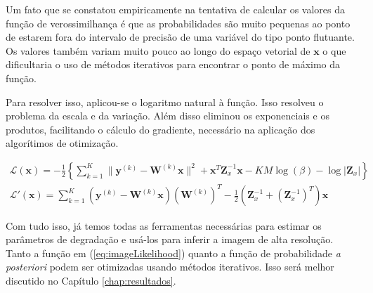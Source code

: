 Um fato que se constatou empiricamente na tentativa de calcular os valores da função de verossimilhança é que as probabilidades são muito pequenas ao ponto de estarem fora do intervalo de precisão de uma variável do tipo ponto flutuante.
Os valores também variam muito pouco ao longo do espaço vetorial de $\mathbf{x}$ o que dificultaria o uso de métodos iterativos para encontrar o ponto de máximo da função.


Para resolver isso, aplicou-se o logaritmo natural à função. Isso resolveu o problema da escala e da variação.
Além disso eliminou os exponenciais e os produtos, facilitando o cálculo do gradiente, necessário na aplicação dos algorítimos de otimização.

\begin{gather}
	\label{eq:imageLikelihood} \mathcal{L}(\mathbf{x}) = -\frac{1}{2} \left\{ \sum^K_{k=1} \|\mathbf{y}^{(k)} - \mathbf{W}^{(k)} \mathbf{x} \|^2 + \mathbf{x}^T\mathbf{Z}^{-1}_x\mathbf{x} - KM\log{(\beta)} - \log{|\mathbf{Z}_x|} \right\} \\ 
	\label{eq:imageLikelihood_gradient} \mathcal{L}'(\mathbf{x}) =  \sum^K_{k=1}  (\mathbf{y}^{(k)} - \mathbf{W}^{(k)}\mathbf{x})(\mathbf{W}^{(k)})^T  - \frac{1}{2}(\mathbf{Z}^{-1}_x + (\mathbf{Z}^{-1}_x)^T)\mathbf{x}  
\end{gather}

Com tudo isso, já temos todas as ferramentas necessárias para estimar os parâmetros de degradação e usá-los para inferir a imagem de alta resolução.
Tanto a função em (\ref{eq:imageLikelihood}) quanto a função de probabilidade \emph{a posteriori} podem ser otimizadas usando métodos iterativos.
Isso será melhor discutido no Capítulo \ref{chap:resultados}.
